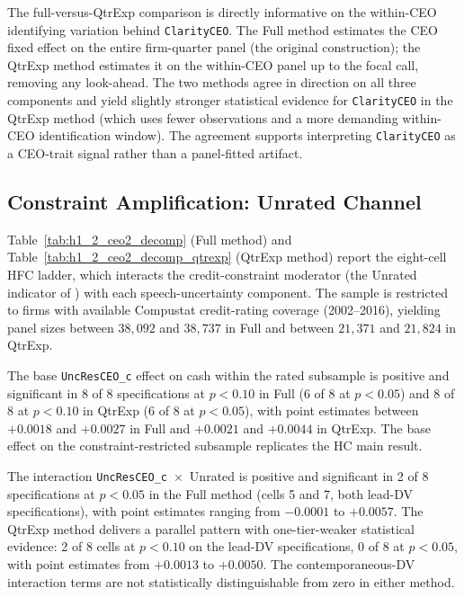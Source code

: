 The full-versus-QtrExp comparison is directly informative on the within-CEO identifying variation behind \texttt{ClarityCEO}. The Full method estimates the CEO fixed effect on the entire firm-quarter panel (the original \citeauthor{dzielinski2021} construction); the QtrExp method estimates it on the within-CEO panel up to the focal call, removing any look-ahead. The two methods agree in direction on all three components and yield slightly stronger statistical evidence for \texttt{ClarityCEO} in the QtrExp method (which uses fewer observations and a more demanding within-CEO identification window). The agreement supports interpreting \texttt{ClarityCEO} as a CEO-trait signal rather than a panel-fitted artifact.

\subsection{Constraint Amplification: Unrated Channel}
\label{sec:main:hfc}

Table~\ref{tab:h1_2_ceo2_decomp} (Full method) and Table~\ref{tab:h1_2_ceo2_decomp_qtrexp} (QtrExp method) report the eight-cell HFC ladder, which interacts the credit-constraint moderator (the Unrated indicator of ) with each speech-uncertainty component. The sample is restricted to firms with available Compustat credit-rating coverage (2002--2016), yielding panel sizes between $38{,}092$ and $38{,}737$ in Full and between $21{,}371$ and $21{,}824$ in QtrExp.

The base \texttt{UncResCEO\_c} effect on cash within the rated subsample is positive and significant in 8 of 8 specifications at $p<0.10$ in Full (6 of 8 at $p<0.05$) and 8 of 8 at $p<0.10$ in QtrExp (6 of 8 at $p<0.05$), with point estimates between $+0.0018$ and $+0.0027$ in Full and $+0.0021$ and $+0.0044$ in QtrExp. The base effect on the constraint-restricted subsample replicates the HC main result.

The interaction \texttt{UncResCEO\_c}~$\times$~Unrated is positive and significant in 2 of 8 specifications at $p<0.05$ in the Full method (cells 5 and 7, both lead-DV specifications), with point estimates ranging from $-0.0001$ to $+0.0057$. The QtrExp method delivers a parallel pattern with one-tier-weaker statistical evidence: 2 of 8 cells at $p<0.10$ on the lead-DV specifications, 0 of 8 at $p<0.05$, with point estimates from $+0.0013$ to $+0.0050$. The contemporaneous-DV interaction terms are not statistically distinguishable from zero in either method.

